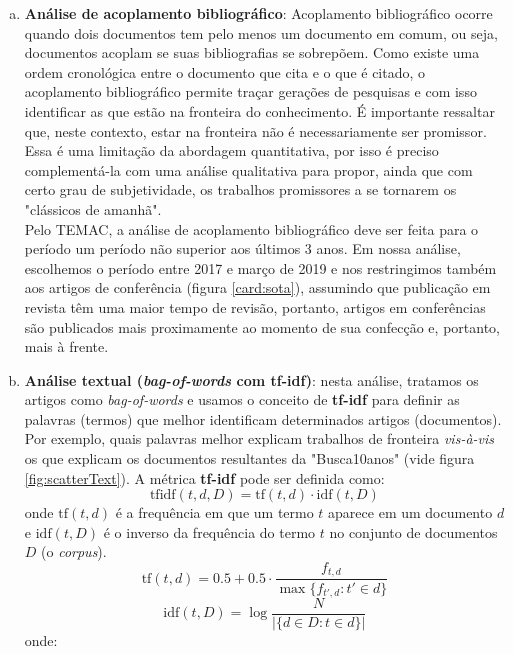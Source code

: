 \documentclass[sigconf]{acmart}
\begin{document}
\begin{enumerate}[a)]
  \item{\textbf{Análise de acoplamento bibliográfico}: Acoplamento bibliográfico ocorre quando dois documentos tem pelo menos um documento em comum, ou seja, documentos acoplam se suas bibliografias se sobrepõem. Como existe uma ordem cronológica entre o documento que cita e o que é citado, o acoplamento bibliográfico permite traçar gerações de pesquisas e com isso identificar as que estão na fronteira do conhecimento.  É importante ressaltar que, neste contexto, estar na fronteira não é necessariamente ser promissor. Essa é uma limitação da abordagem quantitativa, por isso é preciso complementá-la com uma análise qualitativa para propor, ainda que com certo grau de subjetividade, os trabalhos promissores a se tornarem os "clássicos de amanhã". \\Pelo TEMAC, a análise de acoplamento bibliográfico deve ser feita para o período um período não superior aos últimos 3 anos. Em nossa análise, escolhemos o período entre 2017 e março de 2019 e nos restringimos também aos artigos de conferência  (figura \ref{card:sota}), assumindo que publicação em revista têm uma maior tempo de revisão, portanto, artigos em conferências são publicados mais proximamente ao momento de sua confecção e, portanto, mais à frente. 
  }
  \item{\textbf{Análise textual (\emph{bag-of-words}  com tf-idf)}: nesta análise, tratamos os artigos como \emph{bag-of-words} e usamos o conceito de \textbf{tf-idf} para definir as palavras (termos) que melhor identificam determinados artigos (documentos). Por exemplo, quais palavras melhor explicam trabalhos de fronteira \emph{vis-à-vis} os que explicam os documentos resultantes da "Busca10anos" (vide figura \ref{fig:scatterText}). A métrica \textbf{tf-idf} pode ser definida como:
  \begin{equation}
    \mathrm{tfidf}(t,d,D) = \mathrm{tf}(t,d) \cdot \mathrm{idf}(t, D)
  \end{equation}
  onde $\mathrm{tf}(t,d)$ é a frequência em que um termo $t$ aparece em um documento $d$ e $\mathrm{idf}(t, D)$ é o inverso da frequência do termo $t$ no conjunto de documentos $D$ (o \emph{corpus}). 
  \begin{equation}
    \mathrm{tf}(t,d) = 0.5 + 0.5 \cdot  \frac{f_{t, d}}{\max\{f_{t', d}:t' \in d\}}
  \end{equation}
  \begin{equation}
    \mathrm{idf}(t, D) =  \log \frac{N}{|\{d \in D: t \in d\}|}
  \end{equation}
  onde:
  
}
\end{enumerate}
\end{document}
